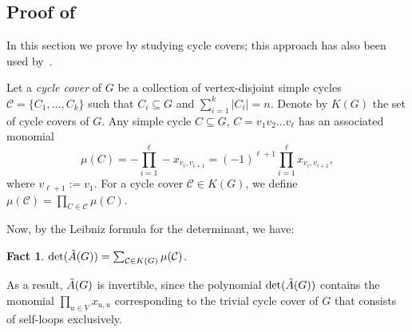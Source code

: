 \documentclass[11pt]{article}
\newtheorem{fact}{Fact}[subsection]
\begin{document}
{\subsection{Proof of }\label{s:redundant-algebraic}
In this section we prove 
by studying cycle covers; this approach has also been used by~\cite{Sankowski04}.

Let a \emph{cycle cover} of $G$ be a collection of vertex-disjoint simple cycles $\mathcal{C}=\{C_1,\ldots,C_k\}$
such that $C_i\subseteq G$ and $\sum_{i=1}^k|C_i|=n$.
Denote by $K(G)$ the set of cycle covers of $G$.
Any simple cycle $C\subseteq G$, $C=v_1v_2\ldots v_\ell$ has an associated monomial
$$\mu(C)=-\prod_{i=1}^\ell -x_{v_i,v_{i+1}}=(-1)^{\ell+1}\prod_{i=1}^\ell x_{v_i,v_{i+1}},$$
where $v_{\ell+1}:=v_1$. For a cycle cover $\mathcal{C}\in K(G)$, we define $\mu(\mathcal{C})=\prod_{C\in\mathcal{C}} \mu(C)$.

Now, by the Leibniz formula for the determinant, we have:
\begin{fact}\label{f:cycle-cover}
  $\det(\tilde{A}(G))=\sum_{\mathcal{C}\in K(G)} \mu(\mathcal{C})$.
\end{fact}
As a result, $\tilde{A}(G)$ is invertible, since the polynomial $\det(\tilde{A}(G))$
contains the monomial $\prod_{u\in V}x_{u,u}$
corresponding to the trivial cycle cover of $G$ that consists of
self-loops exclusively.

}
\end{document}
